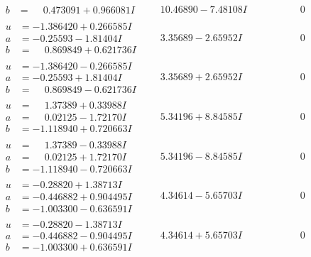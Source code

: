 \documentclass[1p]{elsarticle_modified}
\theoremstyle{definition}
\begin{document}
$$\begin{array}{c|c|c}
\begin{aligned}
b &= \phantom{-}0.473091 + 0.966081 I\end{aligned}
 & \phantom{-}10.46890 - 7.48108 I & \phantom{-0.000000 } 0 \\ \hline\begin{aligned}
u &= -1.386420 + 0.266585 I \\
a &= -0.25593 - 1.81404 I \\
b &= \phantom{-}0.869849 + 0.621736 I\end{aligned}
 & \phantom{-}3.35689 - 2.65952 I & \phantom{-0.000000 } 0 \\ \hline\begin{aligned}
u &= -1.386420 - 0.266585 I \\
a &= -0.25593 + 1.81404 I \\
b &= \phantom{-}0.869849 - 0.621736 I\end{aligned}
 & \phantom{-}3.35689 + 2.65952 I & \phantom{-0.000000 } 0 \\ \hline\begin{aligned}
u &= \phantom{-}1.37389 + 0.33988 I \\
a &= \phantom{-}0.02125 - 1.72170 I \\
b &= -1.118940 + 0.720663 I\end{aligned}
 & \phantom{-}5.34196 + 8.84585 I & \phantom{-0.000000 } 0 \\ \hline\begin{aligned}
u &= \phantom{-}1.37389 - 0.33988 I \\
a &= \phantom{-}0.02125 + 1.72170 I \\
b &= -1.118940 - 0.720663 I\end{aligned}
 & \phantom{-}5.34196 - 8.84585 I & \phantom{-0.000000 } 0 \\ \hline\begin{aligned}
u &= -0.28820 + 1.38713 I \\
a &= -0.446882 + 0.904495 I \\
b &= -1.003300 - 0.636591 I\end{aligned}
 & \phantom{-}4.34614 - 5.65703 I & \phantom{-0.000000 } 0 \\ \hline\begin{aligned}
u &= -0.28820 - 1.38713 I \\
a &= -0.446882 - 0.904495 I \\
b &= -1.003300 + 0.636591 I\end{aligned}
 & \phantom{-}4.34614 + 5.65703 I & \phantom{-0.000000 } 0 \\ \hline\begin{aligned}

\end{aligned}
\end{array}$$
\end{document}
